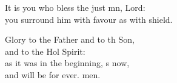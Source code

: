 \begin{psalmverse}
\begin{patverse}
It is you who bless the just mn, Lord:\Med\\
    you surround him with favour as with  shield.

Glory to the Father and to th Son,\Med\\
    and to the Hol Spirit:\\
as it was in the beginning, \pointup{\i}s now,\Med\\
    and will be for ever. men.
  \end{patverse}
\end{psalmverse}
